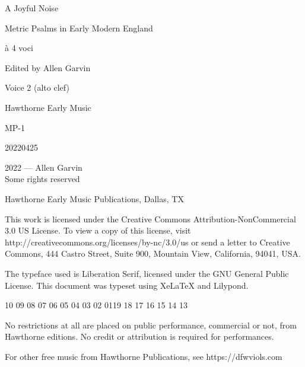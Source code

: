 \documentclass[12pt]{memoir}
\begin{document}
\pagestyle{empty}

\vspace*{\fill}

\begin{center}
\fontsize{44pt}{44pt}\selectfont
    A Joyful Noise\par
    \vspace{1in}
    Metric Psalms in Early Modern England\par
\end{center}

\begin{center}
\fontsize{24pt}{24pt}\selectfont
à 4 voci\par
    \vspace{1in}
\end{center}

\begin{center}
\fontsize{14pt}{14pt}\selectfont
Edited by Allen Garvin\par
    \vspace{1in}
\fontsize{14pt}{14pt}\selectfont
Voice 2 (alto clef) \par
\vspace*{2mm}
\end{center}

\vspace*{\fill}

\begin{center}
Hawthorne Early Music\par
MP-1\par
20220425
\end{center}

\begingroup
\footnotesize
\setlength{\parindent}{0pt}
\setlength{\parskip}{\baselineskip}
\textcopyright{}2022 --- Allen Garvin\\
Some rights reserved

Hawthorne Early Music Publications, Dallas, TX

This work is licensed under the Creative Commons Attribution-NonCommercial 3.0 US License. To view a copy of this license, visit http://creativecommons.org/licenses/by-nc/3.0/us or send a letter to Creative Commons, 444 Castro Street, Suite 900, Mountain View, California, 94041, USA.

The typeface used is Liberation Serif, licensed under the GNU General Public License. This document was typeset using XeLaTeX and Lilypond.

\begin{center}
10 09 08 07 06 05 04 03 02 01\hspace{2em}19 18 17 16 15 14 13
\end{center}

No restrictions at all are placed on public performance, commercial or not, 
from Hawthorne editions. No credit or attribution is required for 
performances.

For other free music from Hawthorne Publications, see https://dfwviols.com
\end{document}
